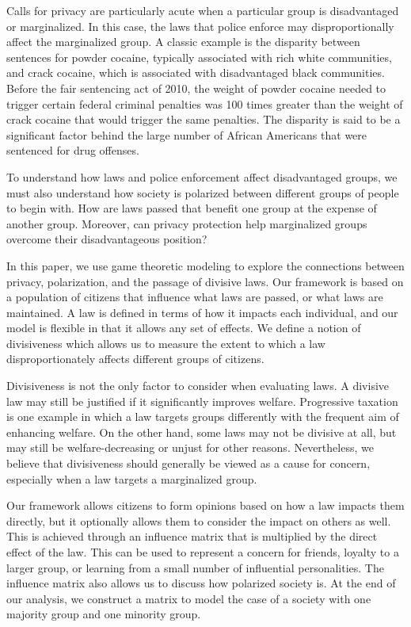 Calls for privacy are particularly acute when a particular group is disadvantaged or marginalized.  In this case, the laws that police enforce may disproportionally affect the marginalized group.  A classic example is the disparity between sentences for powder cocaine, typically associated with rich white communities, and crack cocaine, which is associated with disadvantaged black communities.  Before the fair sentencing act of 2010, the weight of powder cocaine needed to trigger certain federal criminal penalties was 100 times greater than the weight of crack cocaine that would trigger the same penalties.  The disparity is said to be a significant factor behind the large number of African Americans that were sentenced for drug offenses.

To understand how laws and police enforcement affect disadvantaged groups, we must also understand how society is polarized between different groups of people to begin with.  How are laws passed that benefit one group at the expense of another group.  Moreover, can privacy protection help marginalized groups overcome their disadvantageous position?

In this paper, we use game theoretic modeling to explore the connections between privacy, polarization, and the passage of divisive laws.  Our framework is based on a population of citizens that influence what laws are passed, or what laws are maintained.  A law is defined in terms of how it impacts each individual, and our model is flexible in that it allows any set of effects.  We define a notion of divisiveness which allows us to measure the extent to which a law disproportionately affects different groups of citizens.

Divisiveness is not the only factor to consider when evaluating laws.  A divisive law may still be justified if it significantly improves welfare.  Progressive taxation is one example in which a law targets groups differently with the frequent aim of enhancing welfare.  On the other hand, some laws may not be divisive at all, but may still be welfare-decreasing or unjust for other reasons.  Nevertheless, we believe that divisiveness should generally be viewed as a cause for concern, especially when a law targets a marginalized group.

Our framework allows citizens to form opinions based on how a law impacts them directly, but it optionally allows them to consider the impact on others as well.  This is achieved through an influence matrix that is multiplied by the direct effect of the law.  This can be used to represent a concern for friends, loyalty to a larger group, or learning from a small number of influential personalities.  The influence matrix also allows us to discuss how polarized society is.  At the end of our analysis, we construct a matrix to model the case of a society with one majority group and one minority group.

